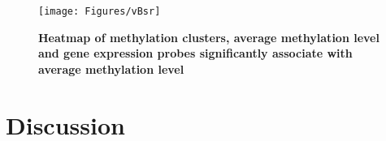 \documentclass{article}
\begin{document}
\begin{figure*}[htb!]
\texttt{[image: Figures/vBsr]}
\caption{\textbf{Heatmap of methylation clusters, average methylation level and gene expression probes significantly associate with average methylation level}}
\end{figure*}

\section{Discussion}



\end{document}
